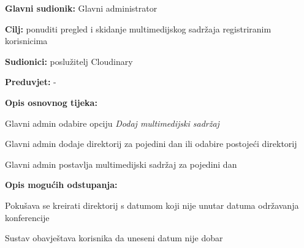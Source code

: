      \noindent {}
					\begin{packed_item}
	
						\item \textbf{Glavni sudionik: }Glavni administrator

						\item  \textbf{Cilj:} ponuditi pregled i skidanje multimedijskog sadržaja registriranim korisnicima
						\item  \textbf{Sudionici:} poslužitelj Cloudinary
						\item  \textbf{Preduvjet:} -
						\item  \textbf{Opis osnovnog tijeka:}
						
						\item[] \begin{packed_enum}
	
							\item Glavni admin odabire opciju \textit{Dodaj multimedijski sadržaj}
							\item Glavni admin dodaje direktorij za pojedini dan ili odabire postojeći direktorij
                                \item Glavni admin postavlja multimedijski sadržaj za pojedini dan
							
						\end{packed_enum}
                     \item  \textbf{Opis mogućih odstupanja:}
						
						\item[] \begin{packed_item}
	
							\item[1.] Pokušava se kreirati direktorij s datumom koji nije unutar datuma održavanja konferencije

							\item[] \begin{packed_enum}
								
								\item Sustav obavještava korisnika da uneseni datum nije dobar
								
							\end{packed_enum}
							
						\end{packed_item}
										
						\end{packed_item}

